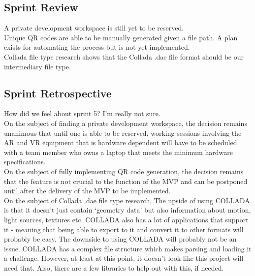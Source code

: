     \subsection{Sprint Review}
    \label{sec:Sprint5_review}
        \hspace{7mm}
        A private development workspace is still yet to be reserved.\\

        Unique QR codes are able to be manually generated given a file path.  A plan exists for automating
        the process but is not yet implemented.\\
        
        Collada file type research shows that the Collada .dae file format should be our intermediary file type.

    \subsection{Sprint Retrospective}
    \label{sec:Sprint5_retrospective}
        \hspace{7mm}
        How did we feel about sprint 5? I'm really not sure.\\
        
        On the subject of finding a private development workspace, the decision remains unanimous that until one 
        is able to be reserved, working sessions involving the AR and VR equipment that is hardware dependent 
        will have to be scheduled with a team member who owns a laptop that meets the minimum hardware
        specifications.\\

        On the subject of fully implementing QR code generation, the decision remains that 
        the feature is not crucial to the function of the MVP and can be postponed until after the delivery
        of the MVP to be implemented.\\

        On the subject of Collada .dae file type research, The upside of using COLLADA is that it doesn't just 
        contain `geometry data' but also information about motion, light sources, textures etc. COLLADA also 
        has a lot of applications that support it - meaning that being able to export to it and convert it to 
        other formats will probably be easy. The downside to using COLLADA will probably not be an issue. 
        COLLADA has a complex file structure which makes parsing and loading it a challenge. However, at least 
        at this point, it doesn't look like this project will need that. Also, there are a few libraries to 
        help out with this, if needed.\\